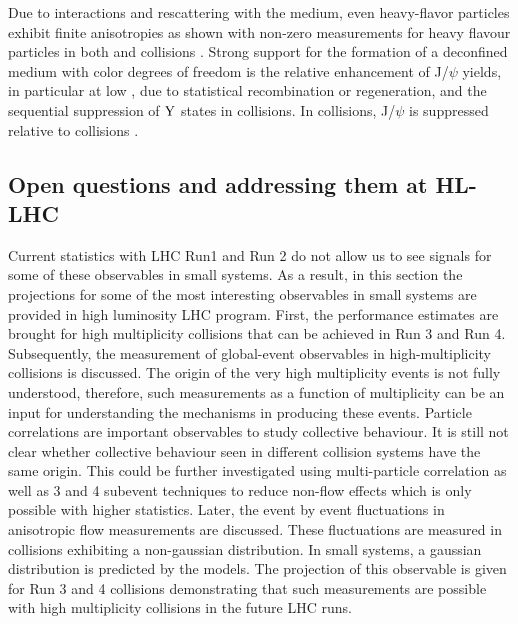 \documentclass[../report.tex]{subfiles}
\begin{document}
Due to interactions and rescattering with the medium, even heavy-flavor particles exhibit finite anisotropies as shown with non-zero \vtwo measurements for heavy flavour particles in both \PbPb and \pPb collisions \cite{ALICE:2013xna,Abelev:2013lca,Abelev:2014ipa,Adam:2015pga,Acharya:2017tfn,Adam:2016ssk,ALICE:2016clc,Acharya:2017qps,Sirunyan:2017plt,Acharya:2017tgv,Khachatryan:2016ypw,Acharya:2018dxy,Sirunyan:2018toe}. Strong support for the formation of a deconfined medium with color degrees of freedom is the relative enhancement of J/$\psi$ yields, in particular at low \pT, due to statistical recombination or regeneration, and the sequential suppression of $\rm{Y}$ states in \PbPb collisions. In \pPb collisions, J/$\psi$ is suppressed relative to \pp collisions \cite{Abelev:2012rv,Adam:2015rba,Chatrchyan:2012lxa, Chatrchyan:2013nza, Abelev:2014zpa, Adam:2015jsa, Adam:2016ohd, Adam:2015rta, Adam:2015isa, Adam:2015gba, Adam:2016rdg, Adamova:2017uhu, Acharya:2017tfn, Acharya:2017hjh, Sirunyan:2017lzi, Khachatryan:2016ypw, Sirunyan:2017mzd, Sirunyan:2017isk, Khachatryan:2016xxp, Sirunyan:2016znt, Aaboud:2017cif, Aaij:2017cqq}.



\subsection{Open questions and addressing them at HL-LHC}
\label{sect:smallsystems_openquestions}

Current statistics with LHC Run1 and Run 2 do not allow us to see signals for some of these observables in small systems. As a result, in this section the projections for some of the most interesting observables in small systems are provided in high luminosity LHC program. First, the performance estimates are brought for high multiplicity \pp collisions that can be achieved in Run 3 and Run 4. Subsequently, the measurement of global-event observables in high-multiplicity \pp collisions is discussed. The origin of the very high multiplicity events is not fully understood, therefore, such measurements as a function of multiplicity can be an input for understanding the mechanisms in producing these events. Particle correlations are important observables to study collective behaviour. It is still not clear whether collective behaviour seen in different collision systems have the same origin. This could be further investigated using multi-particle correlation as well as 3 and 4 subevent techniques to reduce non-flow effects which is only possible with higher statistics. Later, the event by event fluctuations in anisotropic flow measurements are discussed. These fluctuations are measured in \PbPb collisions exhibiting a non-gaussian distribution. In small systems, a gaussian distribution is predicted by the models. The projection of this observable is given for Run 3 and 4 \pp collisions demonstrating that such measurements are possible with high multiplicity \pp collisions in the future LHC runs.
\end{document}
